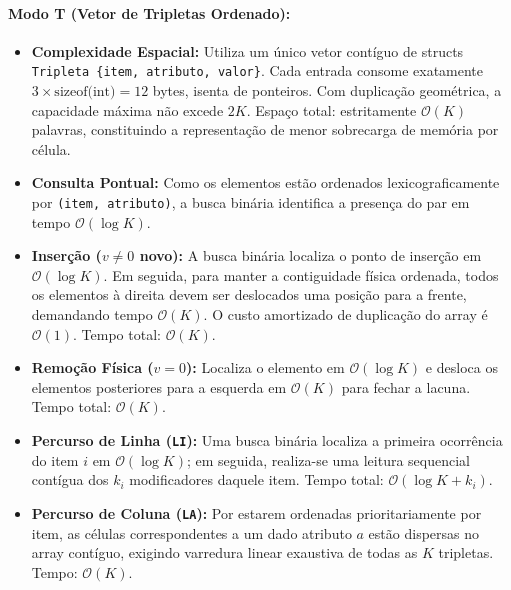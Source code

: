 \documentclass[letterpaper]{article}
\begin{document}
\paragraph{Modo T (Vetor de Tripletas Ordenado):}
\begin{itemize}
    \item \textbf{Complexidade Espacial:} Utiliza um único vetor contíguo de structs \texttt{Tripleta \{item, atributo, valor\}}. Cada entrada consome exatamente $3 \times \text{sizeof(int)} = 12$ bytes, isenta de ponteiros. Com duplicação geométrica, a capacidade máxima não excede $2K$. Espaço total: estritamente $\mathcal{O}(K)$ palavras, constituindo a representação de menor sobrecarga de memória por célula.
    \item \textbf{Consulta Pontual:} Como os elementos estão ordenados lexicograficamente por \texttt{(item, atributo)}, a busca binária identifica a presença do par em tempo $\mathcal{O}(\log K)$.
    \item \textbf{Inserção ($v \neq 0$ novo):} A busca binária localiza o ponto de inserção em $\mathcal{O}(\log K)$. Em seguida, para manter a contiguidade física ordenada, todos os elementos à direita devem ser deslocados uma posição para a frente, demandando tempo $\mathcal{O}(K)$. O custo amortizado de duplicação do array é $\mathcal{O}(1)$. Tempo total: $\mathcal{O}(K)$.
    \item \textbf{Remoção Física ($v = 0$):} Localiza o elemento em $\mathcal{O}(\log K)$ e desloca os elementos posteriores para a esquerda em $\mathcal{O}(K)$ para fechar a lacuna. Tempo total: $\mathcal{O}(K)$.
    \item \textbf{Percurso de Linha (\texttt{LI}):} Uma busca binária localiza a primeira ocorrência do item $i$ em $\mathcal{O}(\log K)$; em seguida, realiza-se uma leitura sequencial contígua dos $k_i$ modificadores daquele item. Tempo total: $\mathcal{O}(\log K + k_i)$.
    \item \textbf{Percurso de Coluna (\texttt{LA}):} Por estarem ordenadas prioritariamente por item, as células correspondentes a um dado atributo $a$ estão dispersas no array contíguo, exigindo varredura linear exaustiva de todas as $K$ tripletas. Tempo: $\mathcal{O}(K)$.
\end{itemize}
\end{document}
